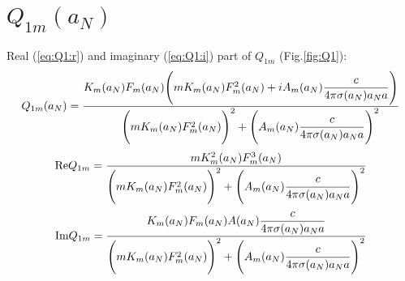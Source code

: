 \documentclass[11pt,oneside,a4paper,notitlepage]{article}
\begin{document}
\section{$Q_{1m}(a_N)$}
Real (\ref{eq:Q1:r}) and imaginary (\ref{eq:Q1:i}) part of $Q_{1m}$ (Fig.\ref{fig:Q1}):
\begin{equation}\label{eq:Q1}
 Q_{1m}(a_N)=\frac{K_m(a_N)F_m(a_N)\Bigg(mK_m(a_N)F_m^2(a_N)+iA_m(a_N)\dfrac{c}{4\pi\sigma(a_N)a_Na}\Bigg)}{\\
 \Bigg(mK_m(a_N)F_m^2(a_N)\Bigg)^2 +\Bigg(A_m(a_N)\dfrac{c}{4\pi\sigma(a_N)a_Na}\Bigg)^2}
\end{equation}
\begin{equation}\label{eq:Q1:r}
 \textnormal{Re}Q_{1m}=\frac{mK_m^2(a_N)F_m^3(a_N)}{\\
 \Bigg(mK_m(a_N)F_m^2(a_N)\Bigg)^2+\Bigg(A_m(a_N)\dfrac{c}{4\pi\sigma(a_N)a_Na}\Bigg)^2}
\end{equation}
\begin{equation}\label{eq:Q1:i}
 \textnormal{Im}Q_{1m}=\frac{K_m(a_N)F_m(a_N)A(a_N)\dfrac{c}{4\pi\sigma(a_N)a_N a}}{\\
 \Bigg(mK_m(a_N)F_m^2(a_N)\Bigg)^2+\Bigg(A_m(a_N)\dfrac{c}{4\pi\sigma(a_N)a_Na}\Bigg)^2}
\end{equation}
\end{document}
